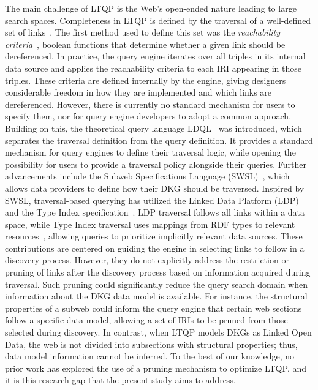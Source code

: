 The main challenge of LTQP is the Web's open-ended nature leading to large search spaces.
Completeness in LTQP is defined by the traversal of a well-defined set of links~\cite{Hartig2012}.
The first method used to define this set was the \emph{reachability criteria}~\cite{Hartig2012}, boolean functions that determine whether a given link should be dereferenced. 
In practice, the query engine iterates over all triples in its internal data source and applies the reachability criteria to each IRI appearing in those triples. 
These criteria are defined internally by the engine, giving designers considerable freedom in how they are implemented and which links are dereferenced. 
However, there is currently no standard mechanism for users to specify them, nor for query engine developers to adopt a common approach.
Building on this, the theoretical query language LDQL~\cite{hartigLDQL} was introduced, which separates the traversal definition from the query definition. 
It provides a standard mechanism for query engines to define their traversal logic, while opening the possibility for users to provide a traversal policy alongside their queries.
Further advancements include the Subweb Specifications Language (SWSL)~\cite{Bogaerts2021LinkTW}, which allows data providers to define how their DKG should be traversed.
Inspired by SWSL, traversal-based querying has utilized the Linked Data Platform (LDP) and the Type Index specification~\cite{Taelman2023}.  
LDP traversal follows all links within a data space, while Type Index traversal uses mappings from RDF types to relevant resources~\cite{solidTypeIndexes}, allowing queries to prioritize implicitly relevant data sources.
These contributions are centered on guiding the engine in selecting links to follow in a discovery process.
However, they do not explicitly address the restriction or pruning of links after the discovery process based on information acquired during traversal. 
Such pruning could significantly reduce the query search domain when information about the DKG data model is available. 
For instance, the structural properties of a subweb could inform the query engine that certain web sections follow a specific data model, allowing a set of IRIs to be pruned from those selected during discovery. 
In contrast, when LTQP models DKGs as Linked Open Data, the web is not divided into subsections with structural properties; thus, data model information cannot be inferred. 
To the best of our knowledge, no prior work has explored the use of a pruning mechanism to optimize LTQP, and it is this research gap that the present study aims to address.

